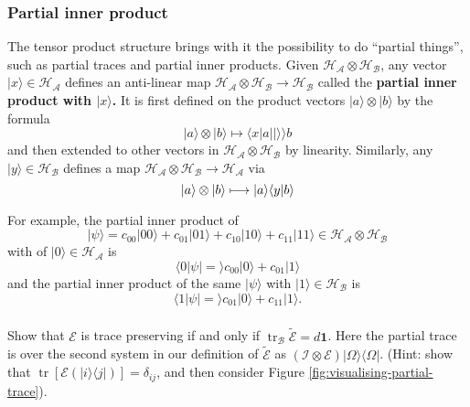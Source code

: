 \documentclass[fleqn]{article}
\begin{document}
\hypertarget{partial-inner-product}{%
\subsubsection{Partial inner product}\label{partial-inner-product}}

The tensor product structure brings with it the possibility to do ``partial things'', such as partial traces and partial inner products.
Given \(\mathcal{H}_{\mathcal{A}}\otimes\mathcal{H}_{\mathcal{B}}\), any vector \(|x\rangle\in\mathcal{H}_{\mathcal{A}}\) defines an anti-linear map \(\mathcal{H}_{\mathcal{A}}\otimes\mathcal{H}_{\mathcal{B}}\to\mathcal{H}_{\mathcal{B}}\) called the \textbf{partial inner product with \(|x\rangle\).}
It is first defined on the product vectors \(|a\rangle\otimes|b\rangle\) by the formula
\[
  |a\rangle\otimes|b\rangle
  \longmapsto \langle x|a||\rangle\rangle{b}
\]
and then extended to other vectors in \(\mathcal{H}_{\mathcal{A}}\otimes\mathcal{H}_{\mathcal{B}}\) by linearity.
Similarly, any \(|y\rangle\in\mathcal{H}_{\mathcal{B}}\) defines a map \(\mathcal{H}_{\mathcal{A}}\otimes\mathcal{H}_{\mathcal{B}}\to\mathcal{H}_{\mathcal{A}}\) via
\[
  |a\rangle\otimes|b\rangle
  \longmapsto |a\rangle\langle y|b\rangle
\]

For example, the partial inner product of
\[
  |\psi\rangle=c_{00}|00\rangle+c_{01}|01\rangle+c_{10}|10\rangle+c_{11}|11\rangle\in\mathcal{H}_{\mathcal{A}}\otimes\mathcal{H}_{\mathcal{B}}
\]
with of \(|0\rangle\in\mathcal{H}_{\mathcal{A}}\) is
\[
  \langle 0|\psi|=\rangle c_{00}|0\rangle + c_{01}|1\rangle
\]
and the partial inner product of the same \(|\psi\rangle\) with \(|1\rangle\in\mathcal{H}_{\mathcal{B}}\) is
\[
  \langle 1|\psi|=\rangle c_{01}|0\rangle + c_{11}|1\rangle.
\]

\hypertarget{section-15}{%
\subsubsection{}\label{section-15}}

Show that \(\mathcal{E}\) is trace preserving if and only if \(\operatorname{tr}_{\mathcal{B}}\widetilde{\mathcal{E}}=d\mathbf{1}\).
Here the partial trace is over the second system in our definition of \(\widetilde{\mathcal{E}}\) as \((\mathcal{I}\otimes\mathcal{E})|\Omega\rangle\langle\Omega|\).
(Hint: show that \(\operatorname{tr}[\mathcal{E}(|i\rangle\langle j|)]=\delta_{ij}\), and then consider Figure \ref{fig:visualising-partial-trace}).

\hypertarget{section-16}{%
\subsubsection{}\label{section-16}}
\end{document}
